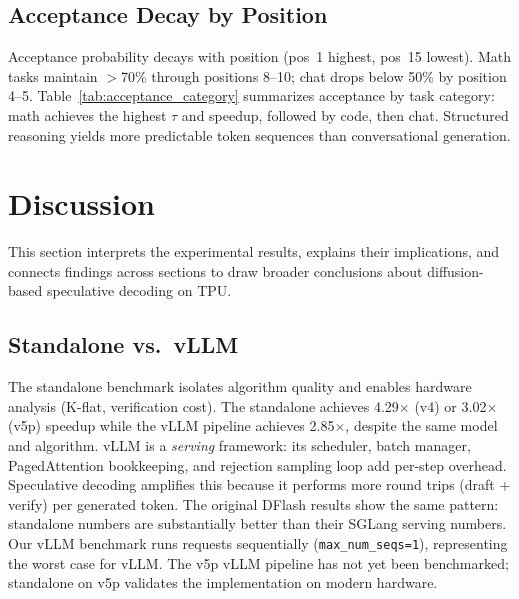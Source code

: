 \documentclass[12pt,letterpaper]{article}
\begin{document}
\subsection{Acceptance Decay by Position}

Acceptance probability decays with position (pos~1 highest, pos~15 lowest). Math tasks maintain $>$70\% through positions 8--10; chat drops below 50\% by position 4--5. Table~\ref{tab:acceptance_category} summarizes acceptance by task category: math achieves the highest $\tau$ and speedup, followed by code, then chat. Structured reasoning yields more predictable token sequences than conversational generation.

\begin{table}[htbp]
\caption{Acceptance length ($\tau$) and speedup by task category (V5P standalone).}
\label{tab:acceptance_category}
\centering

\end{table}


\section{Discussion}

This section interprets the experimental results, explains their implications, and connects findings across sections to draw broader conclusions about diffusion-based speculative decoding on TPU.

\subsection{Standalone vs.\ vLLM}

The standalone benchmark isolates algorithm quality and enables hardware analysis (K-flat, verification cost). The standalone achieves 4.29$\times$ (v4) or 3.02$\times$ (v5p) speedup while the vLLM pipeline achieves 2.85$\times$, despite the same model and algorithm. vLLM is a \emph{serving} framework: its scheduler, batch manager, PagedAttention bookkeeping, and rejection sampling loop add per-step overhead. Speculative decoding amplifies this because it performs more round trips (draft + verify) per generated token. The original DFlash results show the same pattern: standalone numbers are substantially better than their SGLang serving numbers. Our vLLM benchmark runs requests sequentially (\texttt{max\_num\_seqs=1}), representing the worst case for vLLM. The v5p vLLM pipeline has not yet been benchmarked; standalone on v5p validates the implementation on modern hardware.
\end{document}
